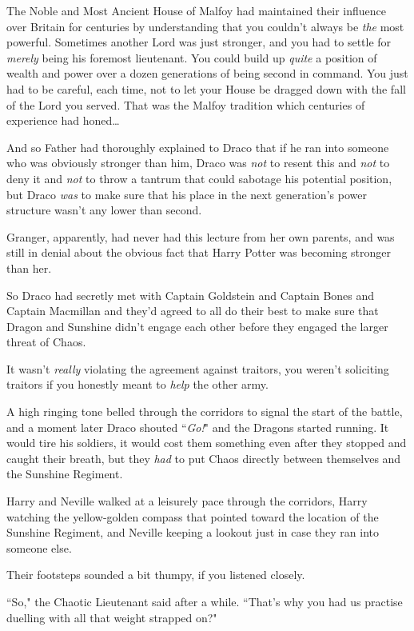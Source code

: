 The Noble and Most Ancient House of Malfoy had maintained their influence over Britain for centuries by understanding that you couldn't always be \emph{the} most powerful. Sometimes another Lord was just stronger, and you had to settle for \emph{merely} being his foremost lieutenant. You could build up \emph{quite} a position of wealth and power over a dozen generations of being second in command. You just had to be careful, each time, not to let your House be dragged down with the fall of the Lord you served. That was the Malfoy tradition which centuries of experience had honed…

And so Father had thoroughly explained to Draco that if he ran into someone who was obviously stronger than him, Draco was \emph{not} to resent this and \emph{not} to deny it and \emph{not} to throw a tantrum that could sabotage his potential position, but Draco \emph{was} to make sure that his place in the next generation's power structure wasn't any lower than second.

Granger, apparently, had never had this lecture from her own parents, and was still in denial about the obvious fact that Harry Potter was becoming stronger than her.

So Draco had secretly met with Captain Goldstein and Captain Bones and Captain Macmillan and they'd agreed to all do their best to make sure that Dragon and Sunshine didn't engage each other before they engaged the larger threat of Chaos.

It wasn't \emph{really} violating the agreement against traitors, you weren't soliciting traitors if you honestly meant to \emph{help} the other army.

A high ringing tone belled through the corridors to signal the start of the battle, and a moment later Draco shouted ``\emph{Go!}" and the Dragons started running. It would tire his soldiers, it would cost them something even after they stopped and caught their breath, but they \emph{had} to put Chaos directly between themselves and the Sunshine Regiment.

\later

Harry and Neville walked at a leisurely pace through the corridors, Harry watching the yellow-golden compass that pointed toward the location of the Sunshine Regiment, and Neville keeping a lookout just in case they ran into someone else.

Their footsteps sounded a bit thumpy, if you listened closely.

``So," the Chaotic Lieutenant said after a while. ``That's why you had us practise duelling with all that weight strapped on?"

